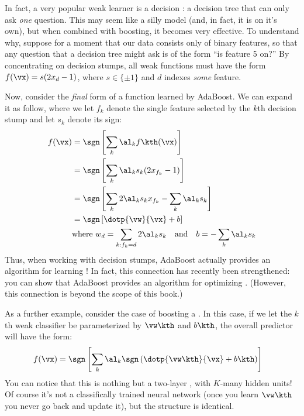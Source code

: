 In fact, a very popular weak learner is a decision : a decision tree that can only ask \emph{one} question.  This
may seem like a silly model (and, in fact, it is on it's own), but
when combined with boosting, it becomes very effective.  To understand
why, suppose for a moment that our data consists only of binary
features, so that any question that a decision tree might ask is of
the form ``is feature 5 on?''  By concentrating on decision stumps,
all weak functions must have the form $f(\vx) = s (2 x_d - 1)$, where
$s \in \{\pm 1\}$ and $d$ indexes \emph{some} feature.


Now, consider the \emph{final} form of a function learned by
AdaBoost.  We can expand it as follow, where we let $f_k$ denote the
single feature selected by the $k$th decision stump and let $s_k$
denote its sign:
%
\begin{align}
f(\vx) 
&= \sgn\left[ \sum_k \al_k f\kth(\vx) \right] \\
&= \sgn\left[ \sum_k \al_k s_k (2 x_{f_k} - 1) \right] \\
&= \sgn\left[ \sum_k 2 \al_k s_k x_{f_k} - \sum_k \al_k s_k \right] \\
&= \sgn\left[ \dotp{\vw}{\vx} + b \right] \\
& \text{where }
w_d = \sum_{k : f_k=d} 2 \al_k s_k \quad \text{and} \quad
b   = - \sum_k \al_k s_k
\end{align}
%
Thus, when working with decision stumps, AdaBoost actually provides an
algorithm for learning !  In fact, this
connection has recently been strengthened: you can show that AdaBoost
provides an algorithm for optimizing .
(However, this connection is beyond the scope of this book.)

As a further example, consider the case of boosting a .  In this case, if we let the $k$th weak classifier be
parameterized by $\vw\kth$ and $b\kth$, the overall predictor will
have the form:
%
\begin{align}
f(\vx)
&= \sgn\left[ \sum_k \al_k \sgn\left( \dotp{\vw\kth}{\vx}+b\kth \right) \right]
\end{align}
%
You can notice that this is nothing but a two-layer , with $K$-many hidden units!  Of course it's not a
classifically trained neural network (once you learn $\vw\kth$ you
never go back and update it), but the structure is identical.

